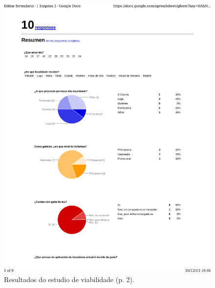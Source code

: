 \begin{figure}[htbp]
 \centering
 \includegraphics[scale=0.7,page=2,keepaspectratio=true,clip,trim=0cm 0.5cm 0cm 0.5cm]{./imagenes/enquisa.pdf}
 \caption{Resultados do estudio de viabilidade (p. 2).}
 \label{figura:ResultadosEstudioViabilidade2}
\end{figure}

